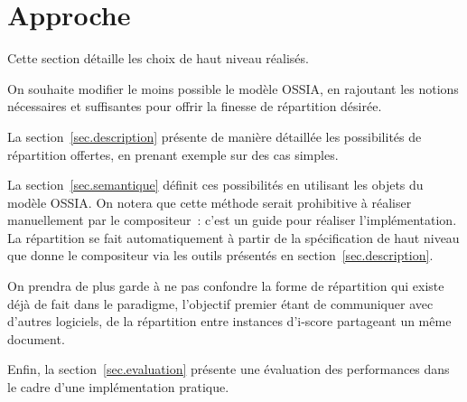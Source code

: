 \documentclass{article}
\newcommand\ossia{OSSIA\xspace}
\begin{document}





\section{Approche}
Cette section détaille les choix de haut niveau réalisés.

On souhaite modifier le moins possible le modèle \ossia, 
en rajoutant les notions nécessaires et suffisantes pour offrir la finesse de répartition désirée.

La section~\ref{sec.description} présente de manière détaillée les possibilités 
de répartition offertes, en prenant exemple sur des cas simples.

La section~\ref{sec.semantique} définit ces possibilités en utilisant les objets du modèle \ossia. 
On notera que cette méthode serait prohibitive à réaliser manuellement par le compositeur~: c'est un guide pour réaliser l'implémentation. 
La répartition se fait automatiquement à partir de la spécification de haut niveau que donne le compositeur via les outils présentés en section~\ref{sec.description}. 

On prendra de plus garde à ne pas confondre la forme de répartition qui existe déjà de fait dans le paradigme, l'objectif premier étant de communiquer avec d'autres logiciels, de la répartition entre instances d'i-score partageant un même document.

Enfin, la section~\ref{sec.evaluation} présente une évaluation des performances dans le cadre 
d'une implémentation pratique.

\end{document}

